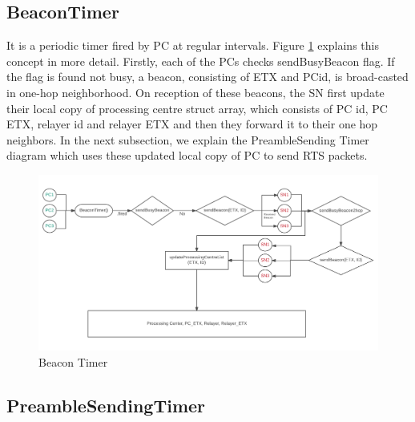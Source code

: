 	\subsection*{BeaconTimer}
    
    It is a periodic timer fired by \ac{PC} at regular intervals. Figure \ref{fig:BeaconTimer} explains this concept in more detail. Firstly, each of the \acp{PC} checks sendBusyBeacon flag. If the flag is found not busy, a beacon, consisting of \ac{ETX} and \ac{PC}id, is broad-casted in one-hop neighborhood. On reception of these beacons, the \ac{SN} first update their local copy of processing centre struct array, which consists of \ac{PC} id, \ac{PC} \ac{ETX}, relayer id and relayer \ac{ETX} and then they forward it to their one hop neighbors. In the next subsection, we explain the PreambleSending Timer diagram which uses these updated local copy of \ac{PC} to send \ac{RTS} packets.

	\begin{figure}
    \centering
    \includegraphics[width=1.0\textwidth]{gfx/BeaconTimer.png}
    \caption{Beacon Timer}
    \label{fig:BeaconTimer}
    \end{figure}
    
	\subsection*{PreambleSendingTimer}
	
